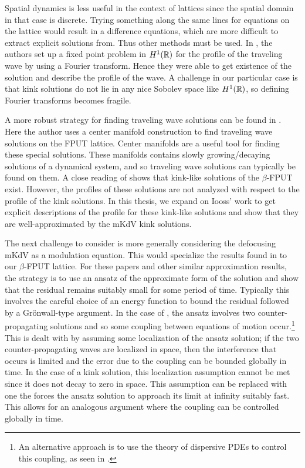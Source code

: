Spatial dynamics is less useful in the context of lattices since the spatial domain in that case is discrete. Trying something along the same lines for equations on the lattice would result in a difference equations, which are more difficult to extract explicit solutions from. Thus other methods must be used. In \cite{friesecke1999solitary}, the authors set up a fixed point problem in \(H^1(\mathbb{R})\) for the profile of the traveling wave by using a Fourier transform. Hence they were able to get existence of the solution and describe the profile of the wave. A challenge in our particular case is that kink solutions do not lie in any nice Sobolev space like \(H^1(\mathbb{R})\), so defining Fourier transforms becomes fragile.

A more robust strategy for finding traveling wave solutions can be found in \cite{iooss2000travelling}. Here the author uses a center manifold construction to find traveling wave solutions on the FPUT lattice. Center manifolds are a useful tool for finding these special solutions. These manifolds contains slowly growing/decaying solutions of a dynamical system, and so traveling wave solutions can typically be found on them. A close reading of \cite{iooss2000travelling} shows that kink-like solutions of the \(\beta\)-FPUT exist. However, the profiles of these solutions are not analyzed with respect to the profile of the kink solutions. In this thesis, we expand on Iooss' work to get explicit descriptions of the profile for these kink-like solutions and show that they are well-approximated by the mKdV kink solutions.

The next challenge to consider is more generally considering the defocusing mKdV as a modulation equation. This would specialize the results found in \cite{schneider2000counter,khan2017long} to our \(\beta\)-FPUT lattice. For these papers and other similar approximation results, the strategy is to use an ansatz of the approximate form of the solution and show that the residual remains suitably small for some period of time. Typically this involves the careful choice of an energy function  to bound the residual followed by a Gr\"onwall-type argument. In the case of \cite{schneider2000counter}, the ansatz involves two counter-propagating solutions and so some coupling between equations of motion occur.\footnote{An alternative approach is to use the theory of dispersive PDEs to control this coupling, as seen in \cite{hong2021korteweg}.} This is dealt with by assuming some localization of the ansatz solution; if the two counter-propagating waves are localized in space, then the interference that occurs is limited and the error due to the coupling can be bounded globally in time. In the case of a kink solution, this localization assumption cannot be met since it does not decay to zero in space. This assumption can be replaced with one the forces the ansatz solution to approach its limit at infinity suitably fast. This allows for an analogous argument where the coupling can be controlled globally in time. 

